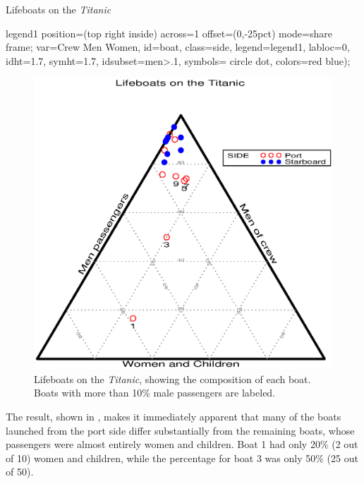 \begin{Example}[lifeboat1]{Lifeboats on the \emph{Titanic}}
\begin{listing}
legend1  position=(top right inside) across=1
   offset=(0,-25pct) mode=share frame;
   var=Crew Men Women,
   id=boat, class=side,
   legend=legend1, labloc=0,
   idht=1.7, symht=1.7,
   idsubset=men>.1,
   symbols= circle dot, colors=red blue);
\end{listing}
\begin{figure}[htb]
  \centering
  \includegraphics[scale=.6]{ch3/fig/lifeboat1}
  \caption[Lifeboats on the \emph{Titanic}]{Lifeboats on the \emph{Titanic},
  showing the composition of each boat.  Boats with more than 10\% male
  passengers are labeled.}%
  \label{fig:lifeboat1}
\end{figure}

The result, shown in , makes it immediately apparent
that many of the boats launched from the port side differ substantially
from the remaining boats, whose passengers were almost entirely women
and children.  Boat 1 had only 20\% (2 out of 10) women and children, while the percentage for boat 3 was only 50\% (25 out of 50).



\end{Example}
